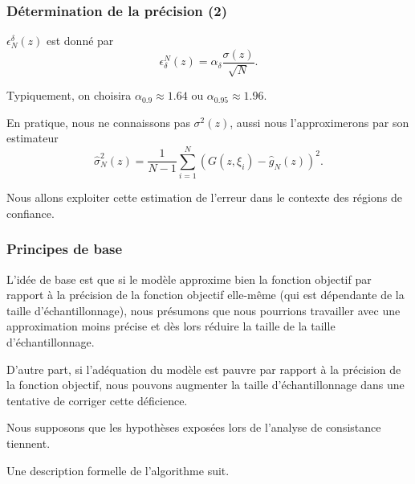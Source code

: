 \documentclass[french]{beamer}
\begin{document}
\begin{frame}
\frametitle{Détermination de la précision (2)}

$\epsilon^{\delta}_N(z)$ est donné par
\[
\epsilon_{\delta}^N(z) = \alpha_{\delta} \frac{\sigma(z)}{\sqrt{N}}.
\]

\mbox{}

Typiquement, on choisira $\alpha_{0.9} \approx 1.64$ ou $\alpha_{0.95}
\approx 1.96$.

\mbox{}

En pratique, nous ne connaissons pas $\sigma^2(z)$, aussi nous
l'approximerons par son estimateur
\[
\hat{\sigma}^2_N(z) = \frac{1}{N-1}\sum_{i = 1}^N ( G(z,\xi_i) -
\hat{g}_N(z))^2.
\]

\mbox{}

Nous allons exploiter cette estimation de l'erreur dans le contexte
des régions de confiance.

\end{frame}

\begin{frame}
\frametitle{Principes de base}

L'idée de base est que si le modèle approxime bien la fonction
objectif par rapport à la précision de la fonction objectif elle-même
(qui est dépendante de la taille d'échantillonnage), nous présumons
que nous pourrions travailler avec une approximation moins précise et
dès lors réduire la taille de la taille d'échantillonnage.

\mbox{}

D'autre part, si l'adéquation du modèle est pauvre par rapport à la
précision de la fonction objectif, nous pouvons augmenter la taille
d'échantillonnage dans une tentative de corriger cette déficience.

\mbox{}

Nous supposons que les hypothèses exposées lors de l'analyse de
consistance tiennent.

\mbox{}

Une description formelle de l'algorithme suit.

\end{frame}
\end{document}
